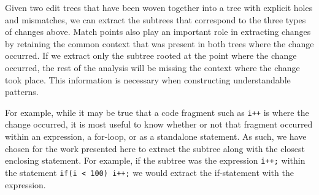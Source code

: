 


Given two edit trees that have been woven together into a tree with explicit
holes and mismatches, we can extract the subtrees that correspond to the three
types of changes above.  Match points also play an important role in
extracting changes by retaining the common context that was present in both
trees where the change occurred.  If we extract only the subtree rooted at the
point where the change occurred, the rest of the analysis will be missing the
context where the change took place. This information is necessary when
constructing understandable patterns.  

For example, while it may be true that a code fragment such as {\tt i++} is
where the change occurred, it is most useful to know whether or not that
fragment occurred within an expression, a for-loop, or as a standalone
statement. As such, we have chosen for the work presented here to extract the
subtree along with the closest enclosing statement. For example, if the
subtree was the expression {\tt i++;} within the statement {\tt if(i < 100)
i++;} we would extract the if-statement with the expression.

